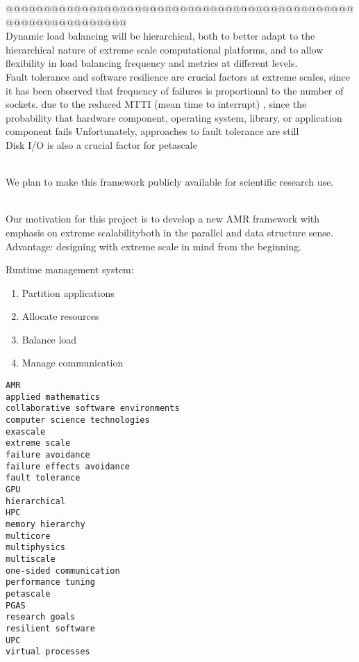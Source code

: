 \documentclass[14pt,letter]{article}
\begin{document}
@@@@@@@@@@@@@@@@@@@@@@@@@@@@@@@@@@@@@@@@@@@@@@@@@@@@@@@@@@@@@@
\ \\ 
Dynamic load balancing will be hierarchical, both to better adapt to
the hierarchical nature of extreme scale computational platforms, and
to allow flexibility in load balancing frequency and metrics at different
levels.
%
\ \\ 
Fault tolerance and software resilience are crucial factors at extreme scales,
since it has been observed that frequency of failures is proportional to
the number of sockets.
due to the reduced MTTI (mean time to interrupt) , since the probability that hardware component, operating system, library, or application component fails Unfortunately, approaches to fault tolerance are still 
%
\ \\ 
Disk I/O is also a crucial factor for petascale 

\ \\ 
We plan to make this framework publicly available for scientific research use.

\ \\ 
Our motivation for this project is to develop a new AMR framework with emphasis on extreme scalabilityboth in the parallel and data structure sense.
Advantage: designing with extreme scale in mind from the beginning.



Runtime management system:
\begin{enumerate}
\item Partition applications
\item Allocate resources
\item Balance load
\item Manage communication
\end{enumerate}

\begin{verbatim}
AMR
applied mathematics
collaborative software environments
computer science technologies
exascale
extreme scale
failure avoidance
failure effects avoidance
fault tolerance
GPU
hierarchical
HPC
memory hierarchy
multicore
multiphysics
multiscale
one-sided communication
performance tuning
petascale
PGAS
research goals
resilient software
UPC
virtual processes
\end{verbatim}
\end{document}
